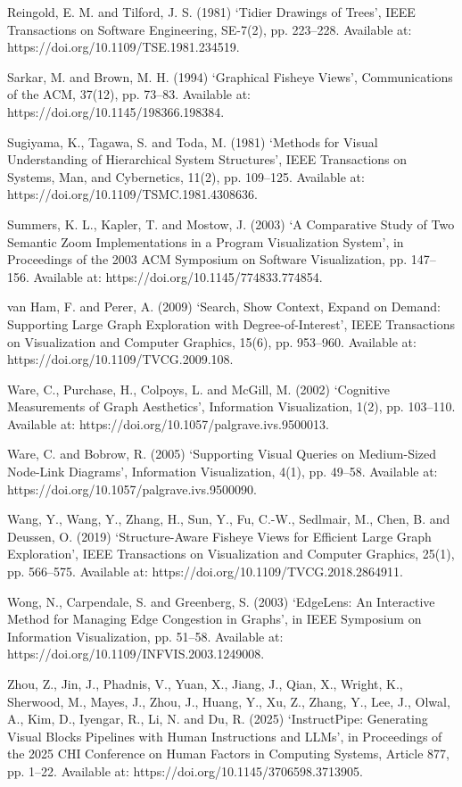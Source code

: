 \documentclass[11pt,a4paper,oneside,extrafontsizes]{memoir}
\begin{document}
Reingold, E. M. and Tilford, J. S. (1981) ‘Tidier Drawings of Trees’, IEEE Transactions on Software Engineering, SE-7(2), pp. 223–228. Available at: https://doi.org/10.1109/TSE.1981.234519.

Sarkar, M. and Brown, M. H. (1994) ‘Graphical Fisheye Views’, Communications of the ACM, 37(12), pp. 73–83. Available at: https://doi.org/10.1145/198366.198384.

Sugiyama, K., Tagawa, S. and Toda, M. (1981) ‘Methods for Visual Understanding of Hierarchical System Structures’, IEEE Transactions on Systems, Man, and Cybernetics, 11(2), pp. 109–125. Available at: https://doi.org/10.1109/TSMC.1981.4308636.

Summers, K. L., Kapler, T. and Mostow, J. (2003) ‘A Comparative Study of Two Semantic Zoom Implementations in a Program Visualization System’, in Proceedings of the 2003 ACM Symposium on Software Visualization, pp. 147–156. Available at: https://doi.org/10.1145/774833.774854.

van Ham, F. and Perer, A. (2009) ‘Search, Show Context, Expand on Demand: Supporting Large Graph Exploration with Degree-of-Interest’, IEEE Transactions on Visualization and Computer Graphics, 15(6), pp. 953–960. Available at: https://doi.org/10.1109/TVCG.2009.108.

Ware, C., Purchase, H., Colpoys, L. and McGill, M. (2002) ‘Cognitive Measurements of Graph Aesthetics’, Information Visualization, 1(2), pp. 103–110. Available at: https://doi.org/10.1057/palgrave.ivs.9500013.

Ware, C. and Bobrow, R. (2005) ‘Supporting Visual Queries on Medium-Sized Node-Link Diagrams’, Information Visualization, 4(1), pp. 49–58. Available at: https://doi.org/10.1057/palgrave.ivs.9500090.

Wang, Y., Wang, Y., Zhang, H., Sun, Y., Fu, C.-W., Sedlmair, M., Chen, B. and Deussen, O. (2019) ‘Structure-Aware Fisheye Views for Efficient Large Graph Exploration’, IEEE Transactions on Visualization and Computer Graphics, 25(1), pp. 566–575. Available at: https://doi.org/10.1109/TVCG.2018.2864911.

Wong, N., Carpendale, S. and Greenberg, S. (2003) ‘EdgeLens: An Interactive Method for Managing Edge Congestion in Graphs’, in IEEE Symposium on Information Visualization, pp. 51–58. Available at: https://doi.org/10.1109/INFVIS.2003.1249008.

Zhou, Z., Jin, J., Phadnis, V., Yuan, X., Jiang, J., Qian, X., Wright, K., Sherwood, M., Mayes, J., Zhou, J., Huang, Y., Xu, Z., Zhang, Y., Lee, J., Olwal, A., Kim, D., Iyengar, R., Li, N. and Du, R. (2025) ‘InstructPipe: Generating Visual Blocks Pipelines with Human Instructions and LLMs’, in Proceedings of the 2025 CHI Conference on Human Factors in Computing Systems, Article 877, pp. 1–22. Available at: https://doi.org/10.1145/3706598.3713905.
\end{document}
